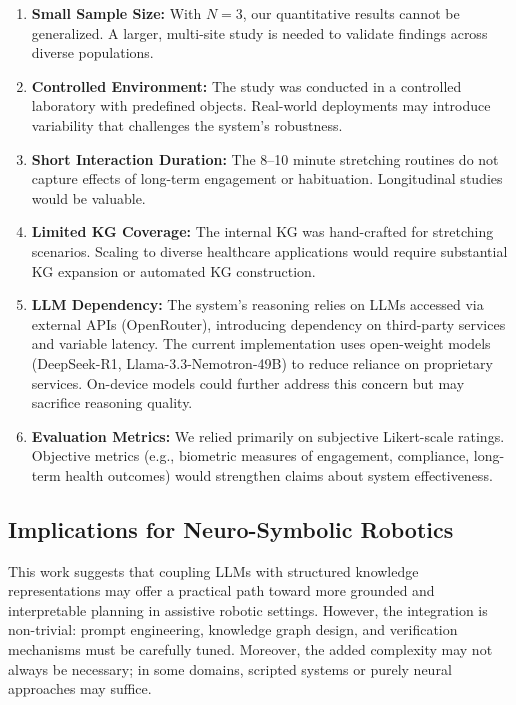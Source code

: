 \documentclass[pdflatex,sn-basic,Numbered,iicol,twocolumn]{sn-jnl}%
\begin{document}
\begin{enumerate}
\item \textbf{Small Sample Size:} With $N=3$, our quantitative results cannot be generalized. A larger, multi-site study is needed to validate findings across diverse populations.

\item \textbf{Controlled Environment:} The study was conducted in a controlled laboratory with predefined objects. Real-world deployments may introduce variability that challenges the system's robustness.

\item \textbf{Short Interaction Duration:} The 8–10 minute stretching routines do not capture effects of long-term engagement or habituation. Longitudinal studies would be valuable.

\item \textbf{Limited KG Coverage:} The internal KG was hand-crafted for stretching scenarios. Scaling to diverse healthcare applications would require substantial KG expansion or automated KG construction.

\item \textbf{LLM Dependency:} The system's reasoning relies on LLMs accessed via external APIs (OpenRouter), introducing dependency on third-party services and variable latency. The current implementation uses open-weight models (DeepSeek-R1, Llama-3.3-Nemotron-49B) to reduce reliance on proprietary services. On-device models could further address this concern but may sacrifice reasoning quality.

\item \textbf{Evaluation Metrics:} We relied primarily on subjective Likert-scale ratings. Objective metrics (e.g., biometric measures of engagement, compliance, long-term health outcomes) would strengthen claims about system effectiveness.
\end{enumerate}

\subsection{Implications for Neuro-Symbolic Robotics}

This work suggests that coupling LLMs with structured knowledge representations may offer a practical path toward more grounded and interpretable planning in assistive robotic settings. However, the integration is non-trivial: prompt engineering, knowledge graph design, and verification mechanisms must be carefully tuned. Moreover, the added complexity may not always be necessary; in some domains, scripted systems or purely neural approaches may suffice.
\end{document}
